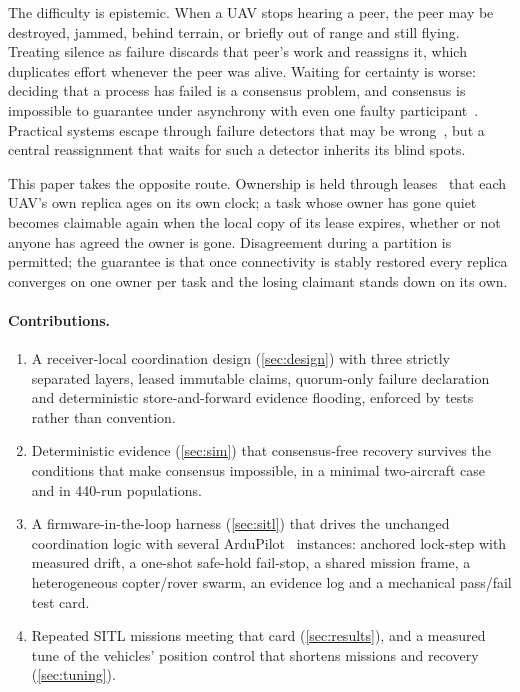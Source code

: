 \documentclass[a4paper,11pt]{article}
\begin{document}
The difficulty is epistemic. When a UAV stops hearing a peer, the peer may be
destroyed, jammed, behind terrain, or briefly out of range and still flying.
Treating silence as failure discards that peer's work and reassigns it, which
duplicates effort whenever the peer was alive. Waiting for certainty is worse:
deciding that a process has failed is a consensus problem, and consensus is
impossible to guarantee under asynchrony with even one faulty
participant~\cite{fischer1985impossibility}. Practical systems escape through
failure detectors that may be wrong~\cite{chandra1996failure}, but a central
reassignment that waits for such a detector inherits its blind spots.

This paper takes the opposite route. Ownership is held through leases~\cite{gray1989leases}
that each UAV's own replica ages on its own clock; a task whose owner has gone
quiet becomes claimable again when the local copy of its lease expires,
whether or not anyone has agreed the owner is gone. Disagreement during a
partition is permitted; the guarantee is that once connectivity is stably
restored every replica converges on one owner per task and the losing
claimant stands down on its own.

\paragraph{Contributions.}
\begin{enumerate}[leftmargin=*]
\item A receiver-local coordination design (\cref{sec:design}) with three
  strictly separated layers, leased immutable claims, quorum-only failure
  declaration and deterministic store-and-forward evidence flooding, enforced
  by tests rather than convention.
\item Deterministic evidence (\cref{sec:sim}) that consensus-free recovery
  survives the conditions that make consensus impossible, in a minimal
  two-aircraft case and in 440-run populations.
\item A firmware-in-the-loop harness (\cref{sec:sitl}) that drives the
  unchanged coordination logic with several ArduPilot~\cite{ardupilot}
  instances: anchored lock-step with measured drift, a one-shot safe-hold
  fail-stop, a shared mission frame, a heterogeneous copter/rover swarm, an
  evidence log and a mechanical pass/fail test card.
\item Repeated SITL missions meeting that card (\cref{sec:results}), and a
  measured tune of the vehicles' position control that shortens missions and
  recovery (\cref{sec:tuning}).
\end{enumerate}
\end{document}
